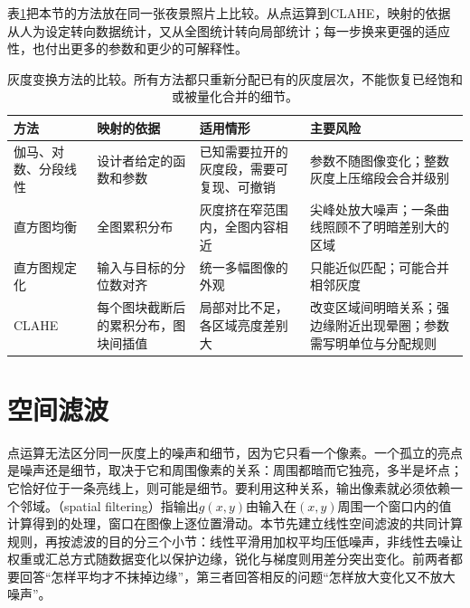 表\ref{tab:vision-transforms-intensity-compare}把本节的方法放在同一张夜景照片上比较。从点运算到CLAHE，映射的依据从人为设定转向数据统计，又从全图统计转向局部统计；每一步换来更强的适应性，也付出更多的参数和更少的可解释性。

\begin{table}[tbp]
  \centering
  \small
  \begin{tabularx}{\linewidth}{@{}p{18mm}XXX@{}}
    \toprule
    方法 & 映射的依据 & 适用情形 & 主要风险\\
    \midrule
    伽马、对数、分段线性 & 设计者给定的函数和参数 & 已知需要拉开的灰度段，需要可复现、可撤销 & 参数不随图像变化；整数灰度上压缩段会合并级别\\
    直方图均衡 & 全图累积分布 & 灰度挤在窄范围内，全图内容相近 & 尖峰处放大噪声；一条曲线照顾不了明暗差别大的区域\\
    直方图规定化 & 输入与目标的分位数对齐 & 统一多幅图像的外观 & 只能近似匹配；可能合并相邻灰度\\
    CLAHE & 每个图块截断后的累积分布，图块间插值 & 局部对比不足，各区域亮度差别大 & 改变区域间明暗关系；强边缘附近出现晕圈；参数需写明单位与分配规则\\
    \bottomrule
  \end{tabularx}
  \caption{灰度变换方法的比较。所有方法都只重新分配已有的灰度层次，不能恢复已经饱和或被量化合并的细节。}
  \label{tab:vision-transforms-intensity-compare}
\end{table}

\section{空间滤波}
\label{sec:vision-transforms-spatial}

点运算无法区分同一灰度上的噪声和细节，因为它只看一个像素。一个孤立的亮点是噪声还是细节，取决于它和周围像素的关系：周围都暗而它独亮，多半是坏点；它恰好位于一条亮线上，则可能是细节。要利用这种关系，输出像素就必须依赖一个邻域。（spatial filtering）指输出$g(x,y)$由输入在$(x,y)$周围一个窗口内的值计算得到的处理，窗口在图像上逐位置滑动。本节先建立线性空间滤波的共同计算规则，再按滤波的目的分三个小节：线性平滑用加权平均压低噪声，非线性去噪让权重或汇总方式随数据变化以保护边缘，锐化与梯度则用差分突出变化。前两者都要回答“怎样平均才不抹掉边缘”，第三者回答相反的问题“怎样放大变化又不放大噪声”。

